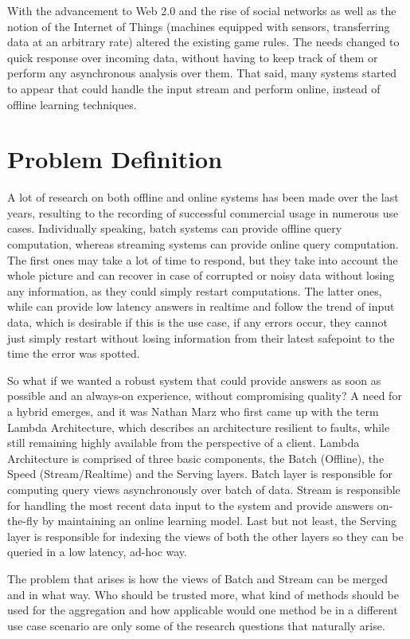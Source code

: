 \documentclass{lmproj}
\begin{document}
With the advancement to Web 2.0 and the rise of social networks as well as the notion of the Internet of Things (machines equipped with sensors, transferring data at an arbitrary rate) altered the existing game rules. The needs changed to quick response over incoming data, without having to keep track of them or perform any asynchronous analysis over them. That said, many systems started to appear that could handle the input stream and perform online, instead of offline learning techniques. 

\section{Problem Definition}
\label{intro}

A lot of research on both offline and online systems has been made over the last years, resulting to the recording of successful commercial usage in numerous use cases. Individually speaking, batch systems can provide offline query computation, whereas streaming systems can provide online query computation. The first ones may take a lot of time to respond, but they take into account the whole picture and can recover in case of corrupted or noisy data without losing any information, as they could simply restart computations. The latter ones, while can provide low latency answers in realtime and follow the trend of input data, which is desirable if this is the use case, if any errors occur, they cannot just simply restart without losing information from their latest safepoint to the time the error was spotted.

So what if we wanted a robust system that could provide answers as soon as possible and an always-on experience, without compromising quality? A need for a hybrid emerges, and it was Nathan Marz who first came up with the term Lambda Architecture, which describes an architecture resilient to faults, while still remaining highly available from the perspective of a client. Lambda Architecture is comprised of three basic components, the Batch (Offline), the Speed (Stream/Realtime) and the Serving layers. Batch layer is responsible for computing query views asynchronously over batch of data. Stream is responsible for handling the most recent data input to the system and provide answers on-the-fly by maintaining an online learning model. Last but not least, the Serving layer is responsible for indexing the views of both the other layers so they can be queried in a low latency, ad-hoc way.

The problem that arises is how the views of Batch and Stream can be merged and in what way. Who should be trusted more, what kind of methods should be used for the aggregation and how applicable would one method be in a different use case scenario are only some of the research questions that naturally arise. 
\end{document}
